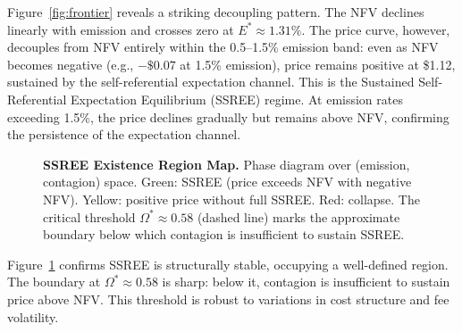 \documentclass[11pt,a4paper]{article}
\begin{document}
Figure~\ref{fig:frontier} reveals a striking decoupling pattern. The NFV declines linearly with emission and crosses zero at $E^* \approx 1.31\%$. The price curve, however, decouples from NFV entirely within the 0.5--1.5\% emission band: even as NFV becomes negative (e.g., $-\$0.07$ at 1.5\% emission), price remains positive at \$1.12, sustained by the self-referential expectation channel. This is the Sustained Self-Referential Expectation Equilibrium (SSREE) regime. At emission rates exceeding 1.5\%, the price declines gradually but remains above NFV, confirming the persistence of the expectation channel.

\begin{figure}[H]
\centering
{}
\caption{\textbf{SSREE Existence Region Map.} Phase diagram over (emission, contagion) space. Green: SSREE (price exceeds NFV with negative NFV). Yellow: positive price without full SSREE. Red: collapse. The critical threshold $\Omega^* \approx 0.58$ (dashed line) marks the approximate boundary below which contagion is insufficient to sustain SSREE.}
\label{fig:phase}
\end{figure}

Figure~\ref{fig:phase} confirms SSREE is structurally stable, occupying a well-defined region. The boundary at $\Omega^* \approx 0.58$ is sharp: below it, contagion is insufficient to sustain price above NFV. This threshold is robust to variations in cost structure and fee volatility.
\end{document}
